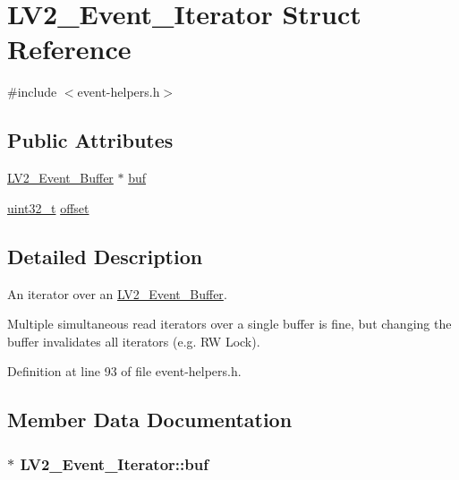 \hypertarget{struct_l_v2___event___iterator}{}\section{L\+V2\+\_\+\+Event\+\_\+\+Iterator Struct Reference}
\label{struct_l_v2___event___iterator}


{\ttfamily \#include $<$event-\/helpers.\+h$>$}

\subsection*{Public Attributes}
\begin{DoxyCompactItemize}
\item 
\hyperlink{struct_l_v2___event___buffer}{L\+V2\+\_\+\+Event\+\_\+\+Buffer} $\ast$ \hyperlink{struct_l_v2___event___iterator_a1b55d0ea61bd472637ea64d8ad213091}{buf}
\item 
\hyperlink{lib-src_2ffmpeg_2win32_2stdint_8h_a6eb1e68cc391dd753bc8ce896dbb8315}{uint32\+\_\+t} \hyperlink{struct_l_v2___event___iterator_a5d47db3ab1017ebee8c7ed56fe88b801}{offset}
\end{DoxyCompactItemize}


\subsection{Detailed Description}
An iterator over an \hyperlink{struct_l_v2___event___buffer}{L\+V2\+\_\+\+Event\+\_\+\+Buffer}.

Multiple simultaneous read iterators over a single buffer is fine, but changing the buffer invalidates all iterators (e.\+g. RW Lock). 

Definition at line 93 of file event-\/helpers.\+h.



\subsection{Member Data Documentation}
\subsubsection[{\texorpdfstring{buf}{buf}}]{$\ast$ L\+V2\+\_\+\+Event\+\_\+\+Iterator\+::buf}\hypertarget{struct_l_v2___event___iterator_a1b55d0ea61bd472637ea64d8ad213091}{}\label{struct_l_v2___event___iterator_a1b55d0ea61bd472637ea64d8ad213091}


